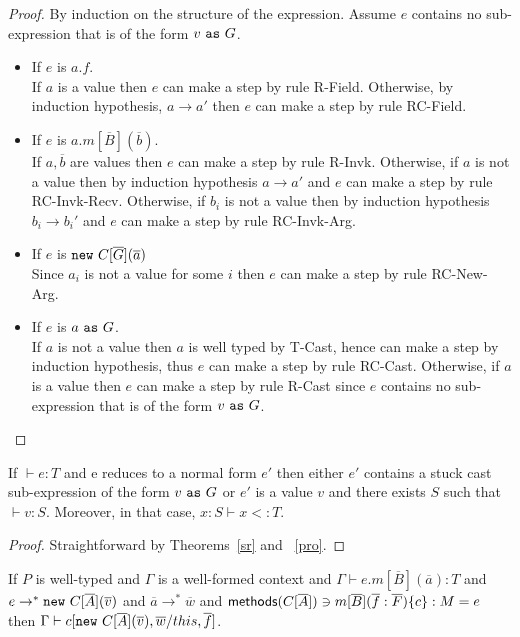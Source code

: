 \begin{proof}By induction on the structure of the expression. Assume $e$ contains no sub-expression that is of the form $v~{\tt as}~G$.
\begin{itemize}
\item If $e$ is $a.f$.\\
If $a$ is a value then $e$ can make a step by rule {\sc R-Field}. Otherwise, by induction hypothesis, $a\rightarrow a'$ then $e$ can make a step by rule {\sc RC-Field}.

\item If $e$ is $a.m[\overline{B}](\overline{b})$. \\
If $a,\overline{b}$ are values then $e$ can make a step by rule {\sc R-Invk}. 
Otherwise, if $a$ is not a value then by induction hypothesis $a\rightarrow a'$ and $e$ can make a step by rule {\sc RC-Invk-Recv}. Otherwise, if $b_i$ is not a value then by induction hypothesis $b_i\rightarrow b_i'$ and $e$ can make a step by rule {\sc RC-Invk-Arg}. 

\item If $e$ is ${\tt new}~C[\overline{G}](\overline{a})$\\
Since $a_i$ is not a value for some $i$ then $e$ can make a step by rule {\sc RC-New-Arg}.

\item If $e$ is $a~{\tt as}~G$.\\
If $a$ is not a value then $a$ is well typed by {\sc T-Cast}, hence can make a step by induction hypothesis, thus $e$ can make a step by rule {\sc RC-Cast}.
Otherwise, if $a$ is a value then $e$ can make a step by rule {\sc R-Cast} since $e$ contains no sub-expression that is of the form $v~{\tt as}~G$.
\end{itemize}
\end{proof}


\begin{thm}
If $\vdash e:T$ and e reduces to a normal form $e'$ then either $e'$ contains a stuck cast sub-expression of the form $v~{\tt as}~G$ or $e'$ is a value $v$ and there exists $S$ such that $\vdash v:S$. Moreover, in that case, $x:S\vdash x<:T$.
\end{thm}

\begin{proof}
Straightforward by Theorems~\ref{sr} and ~\ref{pro}.
\end{proof}



\begin{thm} If $P$ is well-typed and $\Gamma$ is a well-formed context and $\Gamma \vdash e.m[\overline{B}](\overline{a}):T$ and $e \rightarrow^*{\tt new}~C[\overline{A}](\overline{v})$ and $\overline{a} \rightarrow^* \overline{w}$ and ${\sf methods}(C[\overline{A}])\ni m[\overline{B}](\overline{f}:\overline{F})\{c\}:M=e$ then $\Gamma\vdash c[{\tt new}~C[\overline{A}](\overline{v}),\overline{w}/this,\overline{f}]$.
\end{thm}

